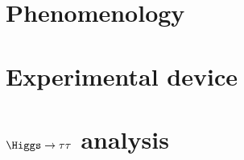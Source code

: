 \subsection*{}
\section{Phenomenology}


\subsection*{}
\section{Experimental device}

%

\subsection*{}
\section{$\Higgs\to\tau\tau$ analysis}


\subsection*{}

